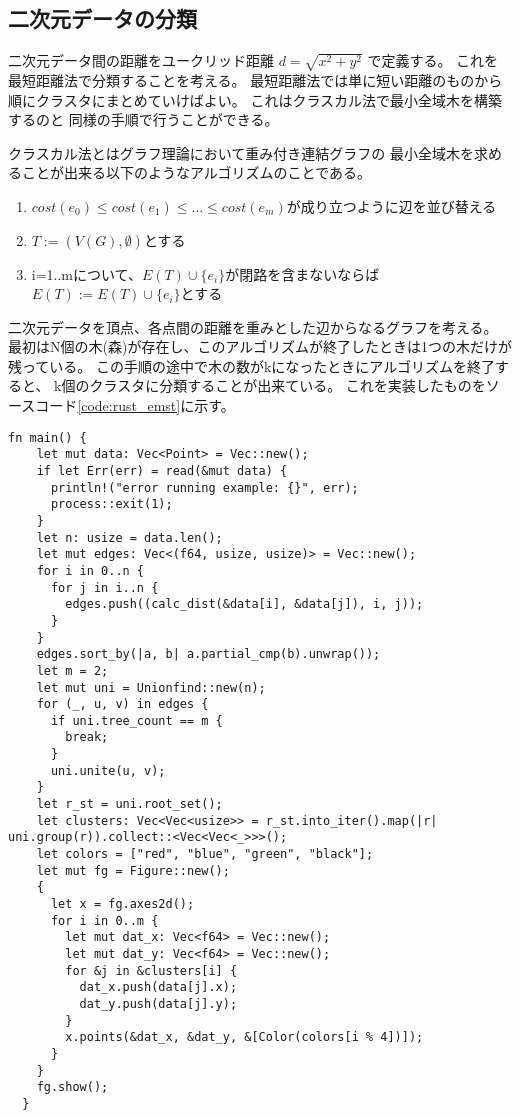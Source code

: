 \documentclass[dvipdfmx]{jsarticle}
\begin{document}
\subsection{二次元データの分類}

二次元データ間の距離をユークリッド距離
$d = \sqrt{x^2 + y^2}$
で定義する。
これを最短距離法で分類することを考える。
最短距離法では単に短い距離のものから順にクラスタにまとめていけばよい。
これはクラスカル法で最小全域木を構築するのと
同様の手順で行うことができる。

クラスカル法とはグラフ理論において重み付き連結グラフの
最小全域木を求めることが出来る以下のようなアルゴリズムのことである。
\begin{enumerate}
  \item $cost(e_0) \leq cost(e_1) \leq \dots \leq cost(e_m)$が成り立つように辺を並び替える
  \item $T:=(V(G),\emptyset)$とする
  \item i=1..mについて、$E(T) \cup \{e_i\}$が閉路を含まないならば$E(T) := E(T) \cup \{e_i\}$とする
\end{enumerate}
二次元データを頂点、各点間の距離を重みとした辺からなるグラフを考える。
最初はN個の木(森)が存在し、このアルゴリズムが終了したときは1つの木だけが残っている。
この手順の途中で木の数がkになったときにアルゴリズムを終了すると、
k個のクラスタに分類することが出来ている。
これを実装したものをソースコード\ref{code:rust_emst}に示す。


\begin{lstlisting}[caption=Rustによる最短距離法の実装,label=code:rust_emst]
  fn main() {
    let mut data: Vec<Point> = Vec::new();
    if let Err(err) = read(&mut data) {
      println!("error running example: {}", err);
      process::exit(1);
    }
    let n: usize = data.len();
    let mut edges: Vec<(f64, usize, usize)> = Vec::new();
    for i in 0..n {
      for j in i..n {
        edges.push((calc_dist(&data[i], &data[j]), i, j));
      }
    }
    edges.sort_by(|a, b| a.partial_cmp(b).unwrap());
    let m = 2;
    let mut uni = Unionfind::new(n);
    for (_, u, v) in edges {
      if uni.tree_count == m {
        break;
      }
      uni.unite(u, v);
    }
    let r_st = uni.root_set();
    let clusters: Vec<Vec<usize>> = r_st.into_iter().map(|r| uni.group(r)).collect::<Vec<Vec<_>>>();
    let colors = ["red", "blue", "green", "black"];
    let mut fg = Figure::new();
    {
      let x = fg.axes2d();
      for i in 0..m {
        let mut dat_x: Vec<f64> = Vec::new();
        let mut dat_y: Vec<f64> = Vec::new();
        for &j in &clusters[i] {
          dat_x.push(data[j].x);
          dat_y.push(data[j].y);
        }
        x.points(&dat_x, &dat_y, &[Color(colors[i % 4])]);
      }
    }
    fg.show();
  }
\end{lstlisting}
\end{document}
